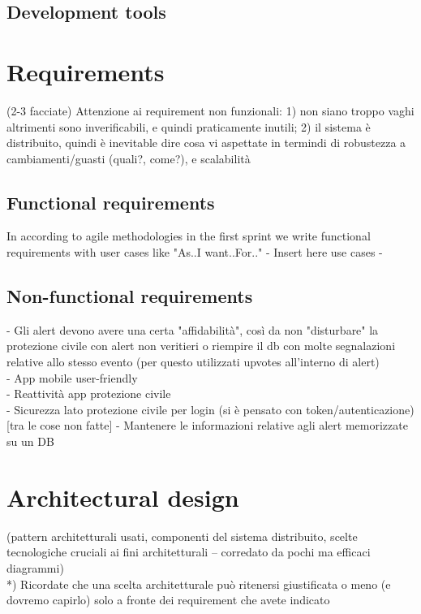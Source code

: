 \documentclass[a4paper,12pt]{report}
\begin{document}
\section{Development tools}

\chapter{Requirements}
(2-3 facciate)
Attenzione ai requirement non funzionali: 1) non siano troppo vaghi altrimenti sono inverificabili, e quindi praticamente inutili; 2) il sistema è distribuito, quindi è inevitable dire cosa vi aspettate in termindi di robustezza a cambiamenti/guasti (quali?, come?), e scalabilità

\section{Functional requirements}

In according to agile methodologies in the first sprint we write functional requirements with user cases like "As..I want..For.."
- Insert here use cases -\\ 

\section{Non-functional requirements}
- Gli alert devono avere una certa "affidabilità", così da non "disturbare" la protezione civile con alert non veritieri o riempire il db con molte segnalazioni relative allo stesso evento (per questo utilizzati upvotes all'interno di alert)\\
- App mobile user-friendly\\
- Reattività app protezione civile\\
- Sicurezza lato protezione civile per login (si è pensato con token/autenticazione) [tra le cose non fatte]
- Mantenere le informazioni relative agli alert memorizzate su un DB

\chapter{Architectural design}

(pattern architetturali usati, componenti del sistema distribuito, scelte tecnologiche cruciali ai fini architetturali -- corredato da pochi ma efficaci diagrammi)\\

*) Ricordate che una scelta architetturale può ritenersi giustificata o meno (e dovremo capirlo) solo a fronte dei requirement che avete indicato\\
\end{document}
